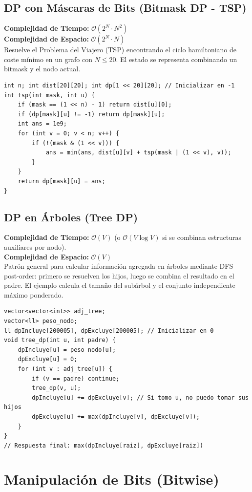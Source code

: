 \documentclass[10pt,twocolumn,letterpaper]{report}
\begin{document}
\section{DP con Máscaras de Bits (Bitmask DP - TSP)}
\textbf{Complejidad de Tiempo:} $\mathcal{O}(2^N \cdot N^2)$ \\
\textbf{Complejidad de Espacio:} $\mathcal{O}(2^N \cdot N)$ \\
Resuelve el Problema del Viajero (TSP) encontrando el ciclo hamiltoniano de coste mínimo en un grafo con $N \le 20$. El estado se representa combinando un bitmask y el nodo actual.
\begin{lstlisting}
int n; int dist[20][20]; int dp[1 << 20][20]; // Inicializar en -1
int tsp(int mask, int u) {
    if (mask == (1 << n) - 1) return dist[u][0];
    if (dp[mask][u] != -1) return dp[mask][u];
    int ans = 1e9;
    for (int v = 0; v < n; v++) {
        if (!(mask & (1 << v))) {
            ans = min(ans, dist[u][v] + tsp(mask | (1 << v), v));
        }
    }
    return dp[mask][u] = ans;
}
\end{lstlisting}
\section{DP en Árboles (Tree DP)}
\textbf{Complejidad de Tiempo:} $\mathcal{O}(V)$ (o $\mathcal{O}(V \log V)$ si se combinan estructuras auxiliares por nodo). \\
\textbf{Complejidad de Espacio:} $\mathcal{O}(V)$ \\
Patrón general para calcular información agregada en árboles mediante DFS post-order: primero se resuelven los hijos, luego se combina el resultado en el padre. El ejemplo calcula el tamaño del subárbol y el conjunto independiente máximo ponderado.
\begin{lstlisting}
vector<vector<int>> adj_tree;
vector<ll> peso_nodo;
ll dpIncluye[200005], dpExcluye[200005]; // Inicializar en 0
void tree_dp(int u, int padre) {
    dpIncluye[u] = peso_nodo[u];
    dpExcluye[u] = 0;
    for (int v : adj_tree[u]) {
        if (v == padre) continue;
        tree_dp(v, u);
        dpIncluye[u] += dpExcluye[v]; // Si tomo u, no puedo tomar sus hijos
        dpExcluye[u] += max(dpIncluye[v], dpExcluye[v]);
    }
}
// Respuesta final: max(dpIncluye[raiz], dpExcluye[raiz])
\end{lstlisting}
\chapter{Manipulación de Bits (Bitwise)}
\end{document}
